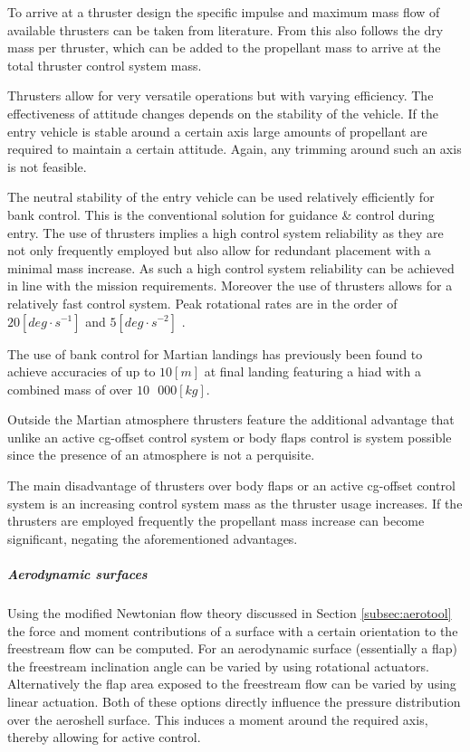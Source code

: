 To arrive at a thruster design the specific impulse and maximum mass flow of available thrusters can be taken from literature. From this also follows the dry mass per thruster, which can be added to the propellant mass to arrive at the total thruster control system mass.

Thrusters allow for very versatile operations but with varying efficiency. The effectiveness of attitude changes depends on the stability of the vehicle. If the entry vehicle is stable around a certain axis large amounts of propellant are required to maintain a certain attitude. Again, any trimming around such an axis is not feasible.

The neutral stability of the entry vehicle can be used relatively efficiently for bank control. This is the conventional solution for guidance \& control during entry. The use of thrusters implies a high control system reliability as they are not only frequently employed but also allow for redundant placement with a minimal mass increase. As such a high control system reliability can be achieved in line with the mission requirements. Moreover the use of thrusters allows for a relatively fast control system. Peak rotational rates are in the order of $20 \left[deg\cdot s^{-1}\right]$ and $5 \left[deg \cdot s^{-2}\right]$ \cite{Davis2010}.

The use of bank control for Martian landings has previously been found \cite{Davis2010} to achieve accuracies of up to $10 \left[m\right]$ at final landing featuring a \gls{hiad} with a combined mass of over $10\mbox{ }000 \left[kg\right]$.

Outside the Martian atmosphere thrusters feature the additional advantage that unlike an active \gls{cg}-offset control system or body flaps control is system possible since the presence of an atmosphere is not a perquisite.

The main disadvantage of thrusters over body flaps or an active \gls{cg}-offset control system is an increasing control system mass as the thruster usage increases. If the thrusters are employed frequently the propellant mass increase can become significant, negating the aforementioned advantages.


\subparagraph{Aerodynamic surfaces}

Using the modified Newtonian flow theory discussed in Section \ref{subsec:aerotool} the force and moment contributions of a surface with a certain orientation to the freestream flow can be computed. For an aerodynamic surface (essentially a flap) the freestream inclination angle can be varied by using rotational actuators. Alternatively the flap area exposed to the freestream flow can be varied by using linear actuation. Both of these options directly influence the pressure distribution over the aeroshell surface. This induces a moment around the required axis, thereby allowing for active control.

